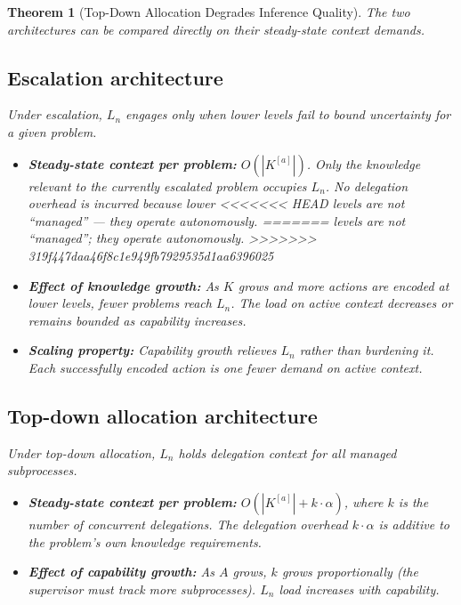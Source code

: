\documentclass[11pt]{article}
\newtheorem{theorem}{Theorem}
\theoremstyle{definition}
\begin{document}
\begin{theorem}[Top-Down Allocation Degrades Inference Quality]
The two architectures can be compared directly on their steady-state
context demands.

\subsection{Escalation architecture}

Under escalation, $L_n$ engages only when lower levels fail to bound
uncertainty for a given problem.

\begin{itemize}
\item \textbf{Steady-state context per problem:} $O(|K^{[a]}|)$.
   Only the knowledge relevant to the currently escalated problem
   occupies $L_n$. No delegation overhead is incurred because lower
<<<<<<< HEAD
   levels are not ``managed'' --- they operate autonomously.
=======
   levels are not ``managed''; they operate autonomously.
>>>>>>> 319f447daa46f8c1e949fb7929535d1aa6396025

\item \textbf{Effect of knowledge growth:} As $K$ grows and more
   actions are encoded at lower levels, \emph{fewer} problems reach
   $L_n$. The load on active context decreases or remains bounded as
   capability increases.

\item \textbf{Scaling property:} Capability growth \emph{relieves}
   $L_n$ rather than burdening it. Each successfully encoded action
   is one fewer demand on active context.
\end{itemize}

\subsection{Top-down allocation architecture}

Under top-down allocation, $L_n$ holds delegation context for all
managed subprocesses.

\begin{itemize}
\item \textbf{Steady-state context per problem:}
   $O(|K^{[a]}| + k \cdot \alpha)$, where $k$ is the number of
   concurrent delegations. The delegation overhead $k \cdot \alpha$
   is additive to the problem's own knowledge requirements.

\item \textbf{Effect of capability growth:} As $A$ grows, $k$ grows
   proportionally (the supervisor must track more subprocesses).
   $L_n$ load increases with capability.


\end{itemize}
\end{theorem}
\end{document}
